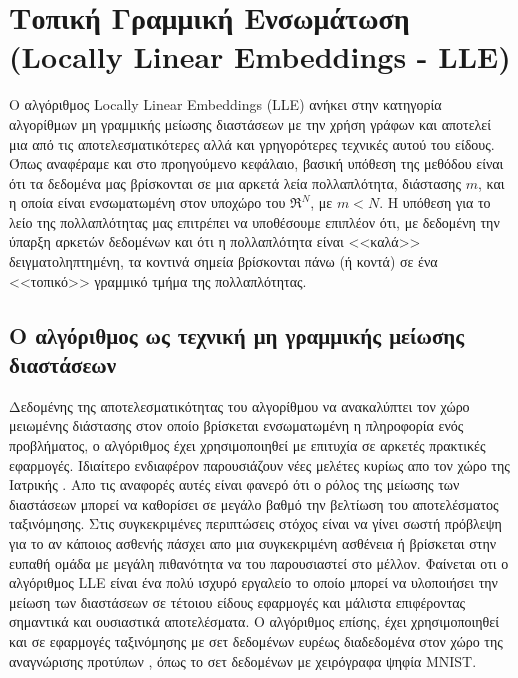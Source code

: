 
\chapter{Τοπική Γραμμική Ενσωμάτωση (\textlatin{Locally Linear Embeddings - LLE})}
\par
Ο αλγόριθμος \textlatin{Locally Linear Embeddings (LLE)}\cite{lle} ανήκει στην κατηγορία αλγορίθμων μη γραμμικής μείωσης διαστάσεων με την χρήση γράφων και αποτελεί μια από τις αποτελεσματικότερες αλλά και γρηγορότερες τεχνικές αυτού του είδους. Όπως αναφέραμε και στο προηγούμενο κεφάλαιο, βασική υπόθεση της μεθόδου είναι ότι τα δεδομένα μας βρίσκονται σε μια αρκετά λεία πολλαπλότητα, διάστασης $m$, και η οποία είναι ενσωματωμένη στον υποχώρο του $ \Re^{N} $, με $m<N$. Η υπόθεση για το λείο της πολλαπλότητας μας επιτρέπει να υποθέσουμε επιπλέον ότι, με δεδομένη την ύπαρξη αρκετών δεδομένων και ότι η πολλαπλότητα είναι <<καλά>> δειγματοληπτημένη, τα κοντινά σημεία βρίσκονται πάνω (ή κοντά) σε ένα <<τοπικό>> γραμμικό τμήμα της πολλαπλότητας.

\section{Ο αλγόριθμος ως τεχνική μη γραμμικής μείωσης διαστάσεων}
\par
Δεδομένης της αποτελεσματικότητας του αλγορίθμου να ανακαλύπτει τον χώρο μειωμένης διάστασης στον οποίο βρίσκεται ενσωματωμένη η πληροφορία ενός προβλήματος, ο αλγόριθμος έχει χρησιμοποιηθεί με επιτυχία σε αρκετές πρακτικές εφαρμογές. Ιδιαίτερο ενδιαφέρον παρουσιάζουν νέες μελέτες κυρίως απο τον χώρο της Ιατρικής \cite{1} \cite{2}. Απο τις αναφορές αυτές είναι φανερό ότι ο ρόλος της μείωσης των διαστάσεων μπορεί να καθορίσει σε μεγάλο βαθμό την βελτίωση του αποτελέσματος ταξινόμησης. Στις συγκεκριμένες περιπτώσεις στόχος είναι να γίνει σωστή πρόβλεψη για το αν κάποιος ασθενής πάσχει απο μια συγκεκριμένη ασθένεια ή βρίσκεται στην ευπαθή ομάδα με μεγάλη πιθανότητα να του παρουσιαστεί στο μέλλον. Φαίνεται οτι ο αλγόριθμος \textlatin{LLE}\textlatin{\cite{lle}} είναι ένα πολύ ισχυρό εργαλείο το οποίο μπορεί να υλοποιήσει την μείωση των διαστάσεων σε τέτοιου είδους εφαρμογές και μάλιστα επιφέροντας σημαντικά και ουσιαστικά αποτελέσματα. Ο αλγόριθμος επίσης, έχει χρησιμοποιηθεί και σε εφαρμογές ταξινόμησης με σετ δεδομένων ευρέως διαδεδομένα στον χώρο της αναγνώρισης προτύπων \cite{3} \cite{4} \cite{5}, όπως το σετ δεδομένων με χειρόγραφα ψηφία \textlatin{MNIST}\textlatin{\cite{mnist}}.

